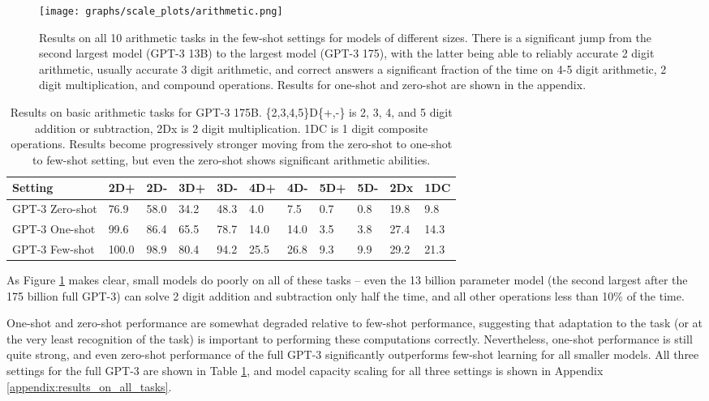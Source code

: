 \documentclass{article}
\begin{document}
\begin{figure}
\centering\texttt{[image: graphs/scale\_plots/arithmetic.png]}
\caption{Results on all 10 arithmetic tasks in the few-shot settings for models of different sizes.  There is a significant jump from the second largest model (GPT-3 13B) to the largest model (GPT-3 175), with the latter being able to reliably accurate 2 digit arithmetic, usually accurate 3 digit arithmetic, and correct answers a significant fraction of the time on 4-5 digit arithmetic, 2 digit multiplication, and compound operations.  Results for one-shot and zero-shot are shown in the appendix.}
\label{graph:arithmetic}
\end{figure} \begin{table}
    \centering
        \begin{tabular}{l l l l l l l l l l l}
        \toprule
        Setting & 2D+ & 2D- & 3D+ & 3D- & 4D+ & 4D- & 5D+ & 5D- & 2Dx & 1DC \\ 
        \midrule
        GPT-3 Zero-shot & 76.9 & 58.0 & 34.2 & 48.3 & 4.0 & 7.5 & 0.7 & 0.8 & 19.8 & 9.8 \\ 
        GPT-3 One-shot & 99.6 & 86.4 & 65.5 & 78.7 & 14.0 & 14.0 & 3.5 & 3.8 & 27.4 & 14.3 \\ 
        GPT-3 Few-shot & 100.0 & 98.9 & 80.4 & 94.2 & 25.5 & 26.8 & 9.3 & 9.9 & 29.2 & 21.3 \\ 
        \bottomrule
        \end{tabular}
    \caption{Results on basic arithmetic tasks for GPT-3 175B. \{2,3,4,5\}D\{+,-\} is 2, 3, 4, and 5 digit addition or subtraction, 2Dx is 2 digit multiplication.  1DC is 1 digit composite operations.  Results become progressively stronger moving from the zero-shot to one-shot to few-shot setting, but even the zero-shot shows significant arithmetic abilities.}
    \label{table:arithmetic}
\end{table} 
As Figure \ref{graph:arithmetic} makes clear, small models do poorly on all of these tasks -- even the 13 billion parameter model (the second largest after the 175 billion full GPT-3) can solve 2 digit addition and subtraction only half the time, and all other operations less than 10\% of the time.

One-shot and zero-shot performance are somewhat degraded relative to few-shot performance, suggesting that adaptation to the task (or at the very least recognition of the task) is important to performing these computations correctly.  Nevertheless, one-shot performance is still quite strong, and even zero-shot performance of the full GPT-3 significantly outperforms few-shot learning for all smaller models.  All three settings for the full GPT-3 are shown in Table \ref{table:arithmetic}, and model capacity scaling for all three settings is shown in Appendix \ref{appendix:results_on_all_tasks}.
\end{document}
